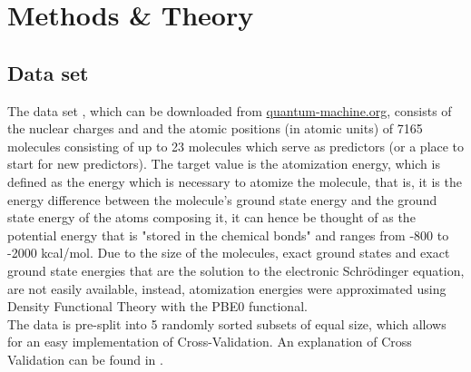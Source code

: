 \documentclass[11pt,a4paper,notitlepage]{article}
\begin{document}
\section{Methods \& Theory}
\subsection{Data set}
The data set \citep{blum,Atomization_Ridge}, which can be downloaded from \href{http://quantum-machine.org/datasets/}{quantum-machine.org}, consists of the nuclear charges  and and the atomic positions (in atomic units) of 7165 molecules consisting of up to 23 molecules which serve as predictors (or a place to start for new predictors). The target value is the atomization energy, which is defined as the energy which is necessary to atomize the molecule, that is, it is the energy difference between the molecule's ground state energy and the ground state energy of the atoms composing it, it can hence be thought of as the potential energy that is "stored in the chemical bonds" and ranges from -800 to -2000 kcal/mol. Due to the size of the molecules, exact ground states and exact ground state energies that are the solution to the electronic Schrödinger equation, are not easily available, instead, atomization energies were approximated using Density Functional Theory with the PBE0 functional. \\
The data is pre-split into 5 randomly sorted subsets of equal size, which allows for an easy implementation of Cross-Validation. An explanation of Cross Validation can be found in \citep{Project2}.
\end{document}
